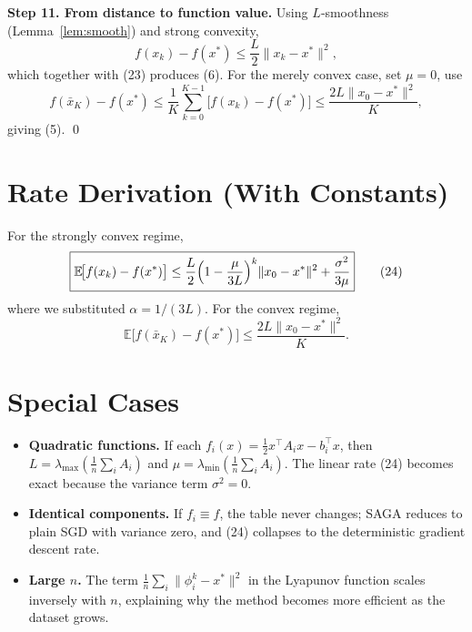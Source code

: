 \documentclass[11pt]{article}
\newcommand{\E}{\mathbb{E}}
\begin{document}
\noindent\textbf{Step 11. From distance to function value.}
Using $L$‑smoothness (Lemma~\ref{lem:smooth}) and strong convexity,
\[
f(x_{k})-f(x^{*})\le \frac{L}{2}\|x_{k}-x^{*}\|^{2},
\]
which together with (23) produces (6).  
For the merely convex case, set $\mu=0$, use
\[
f(\bar{x}_{K})-f(x^{*})\le\frac{1}{K}\sum_{k=0}^{K-1}\bigl[f(x_{k})-f(x^{*})\bigr]
\le\frac{2L\|x_{0}-x^{*}\|^{2}}{K},
\]
giving (5). \qed

\section*{Rate Derivation (With Constants)}
For the strongly convex regime,
\[
\boxed{
\E\!\bigl[f(x_{k})-f(x^{*})\bigr]
\le
\frac{L}{2}\Bigl(1-\frac{\mu}{3L}\Bigr)^{k}\|x_{0}-x^{*}\|^{2}
+\frac{\sigma^{2}}{3\mu}
}
\tag{24}
\]
where we substituted $\alpha=1/(3L)$.  
For the convex regime,
\[
\boxed{
\E\!\bigl[f(\bar{x}_{K})-f(x^{*})\bigr]\le
\frac{2L\|x_{0}-x^{*}\|^{2}}{K}}.
\tag{25}
\]

\section*{Special Cases}
\begin{itemize}
\item \textbf{Quadratic functions.} If each $f_i(x)=\frac12 x^{\top}A_i x-b_i^{\top}x$, then $L=\lambda_{\max}(\frac1n\sum_i A_i)$ and $\mu=\lambda_{\min}(\frac1n\sum_i A_i)$. The linear rate (24) becomes exact because the variance term $\sigma^{2}=0$.
\item \textbf{Identical components.} If $f_i\equiv f$, the table never changes; SAGA reduces to plain SGD with variance zero, and (24) collapses to the deterministic gradient descent rate.
\item \textbf{Large $n$.} The term $\frac{1}{n}\sum_i\|\phi_i^{k}-x^{*}\|^{2}$ in the Lyapunov function scales inversely with $n$, explaining why the method becomes more efficient as the dataset grows.
\end{itemize}
\end{document}
